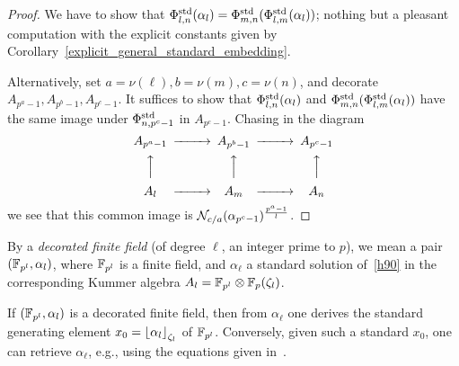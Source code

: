 \documentclass{sig-alternate}
\begin{document}
\begin{proof}
We have to show that ${\Phi^{\mathrm{std}}_{{l},{n}}}(\alpha_l)={\Phi^{\mathrm{std}}_{{m},{n}}}({\Phi^{\mathrm{std}}_{{l},{m}}}(\alpha_l))$;
nothing but a pleasant computation with the explicit constants given 
by Corollary~\ref{explicit_general_standard_embedding}.

Alternatively, set $a=\nu(\ell),b=\nu(m),c=\nu(n)$, and decorate $A_{p^a-1},A_{p^b-1},A_{p^c-1}$.
It suffices to show that ${\Phi^{\mathrm{std}}_{{l},{n}}}(\alpha_l)$
and ${\Phi^{\mathrm{std}}_{{m},{n}}}({\Phi^{\mathrm{std}}_{{l},{m}}}(\alpha_l))$ have the same image under ${\Phi^{\mathrm{std}}_{{n},{p^c-1}}}$
in $A_{p^c-1}$.
Chasing in the diagram
\begin{equation*}
\begin{CD}
A_{p^a-1} @>>> A_{p^b-1} @>>> A_{p^c-1} \\
@AAA @AAA @AAA\\
A_\ell @>>> A_m @>>> A_n
\end{CD}
\end{equation*}
we see that this common image
is $\mathcal{N}_{c/a}(\alpha_{p^c-1})^{\frac{p^a-1}{l}}$.
\end{proof}

By a \emph{decorated finite field} (of degree $\ell$, an integer prime to $p$),
we mean a pair $(\mathbb{F}_{p^l},\alpha_l)$,
where $\mathbb{F}_{p^l}$ is a finite field,
and $\alpha_\ell$ a standard solution of~\eqref{h90} in the corresponding
Kummer algebra $A_l=\mathbb{F}_{p^l}\otimes\mathbb{F}_{p}(\zeta_l)$.

If $(\mathbb{F}_{p^l},\alpha_l)$ is a decorated finite field,
then from $\alpha_\ell$ one derives the standard generating
element $x_0=\left\lfloor \alpha_l \right\rfloor_{\zeta_l}$ of $\mathbb{F}_{p^l}$.
Conversely, given such a standard $x_0$, one can retrieve $\alpha_\ell$,
e.g., using the equations given in~\cite{Allombert02}.
\end{document}
